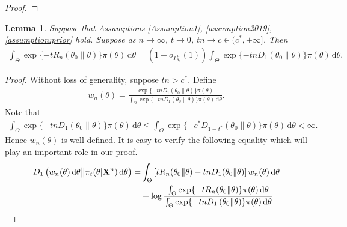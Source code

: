 \documentclass[11pt]{article}
\theoremstyle{plain}
\newtheorem{lemma}{\quad\quad Lemma}
\theoremstyle{definition}
\theoremstyle{remark}
\begin{document}
\begin{appendices}
\begin{proof}
\end{proof}



\begin{lemma}
    Suppose that Assumptions \ref{Assumption1}, \ref{assumption2019}, \ref{assumption:prior} hold.
Suppose as $n \to \infty$, $t \to 0$, $tn \to c \in (c^*,+\infty]$.
Then
\begin{align*}
     \int_{\Theta} \exp \{-t R_n (\theta_0\| \theta)\} \pi (\theta) \, \mathrm d \theta  
     =
     (1+o_{P_{\theta_0}^n}(1))
    \int_\Theta \exp \{- tn D_1 \left( \theta_0 \| \theta \right)\} \pi(\theta) \, \mathrm d \theta.
\end{align*}
    \label{prop:ttowawa}
\end{lemma}
\begin{proof}
    Without loss of generality, suppose $tn > c^*$.
       Define
       \begin{align*}
           w_n(\theta) =
           \frac{
               \exp \{ -t n D_1\left( \theta_0 \| \theta \right) \} \pi(\theta)
           }{
               \int_{\Theta} 
               \exp \{ -t n D_1\left( \theta_0 \| \theta \right) \} \pi(\theta) \, \mathrm d \theta
           }.
       \end{align*}
       Note that
       \begin{align*}
               \int_{\Theta} 
               \exp \{ -t n D_1\left( \theta_0 \| \theta \right) \} \pi(\theta) \, \mathrm d \theta
               \leq
               \int_{\Theta} 
               \exp \{ -c^* D_{1-t^*}\left( \theta_0 \| \theta \right) \} \pi(\theta) \, \mathrm d \theta
               < \infty
               .
       \end{align*}
       Hence $w_n(\theta)$ is well defined.
       It is easy to verify the following equality which will play an important role in our proof.
\begin{equation}\label{eq:leiApp}
    \begin{aligned}
     D_1\left( 
        w_n (\theta) \, \mathrm d \theta
        \big\|
        \pi_t (\theta | \BX^{n}) \, \mathrm d \theta
    \right)
    = &
    \int_{\Theta}
    \left[   t R_n(\theta_0\| \theta) - tn D_1 (\theta_0 \| \theta )  \right]
    w_n (\theta) \, \mathrm d \theta
    \\
    &
    + \log \frac{
        \int_{\Theta} \exp \{-t R_n (\theta_0\| \theta)\} \pi (\theta) \, \mathrm d \theta  
    }
    {
        \int_\Theta \exp \{-tn D_1 \left( \theta_0 \| \theta \right)\} \pi(\theta) \, \mathrm d \theta
    }

\end{aligned}
\end{equation}
\end{proof}
\end{appendices}
\end{document}

